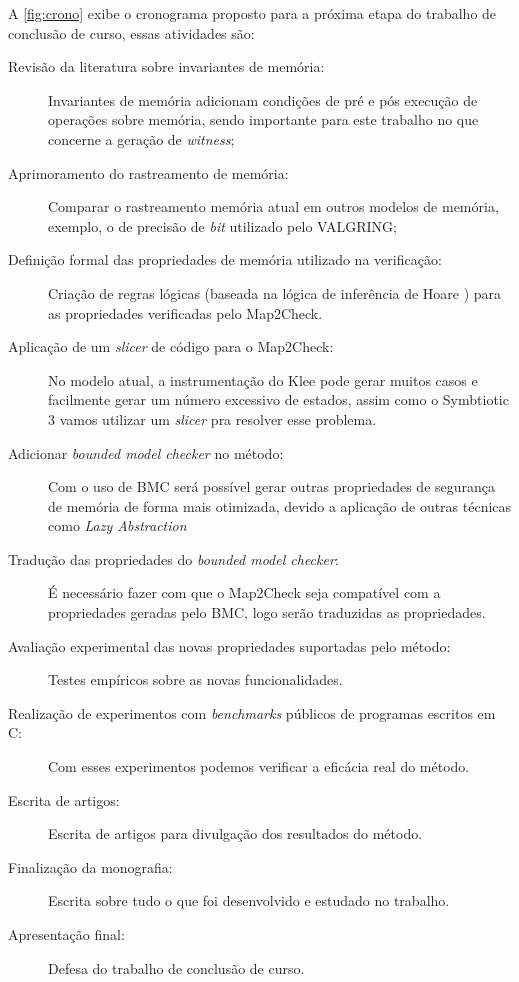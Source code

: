 \label{sec:cronograma}

A \autoref{fig:crono} exibe o cronograma proposto para a próxima etapa do trabalho de conclusão de curso, essas atividades são:

  \begin{description}  
  \item[Revisão da literatura sobre invariantes de memória:] Invariantes de memória adicionam condições de pré e pós execução de operações sobre memória, sendo importante para 
  este trabalho no que concerne a geração de \textit{witness}; 
  \item[Aprimoramento do rastreamento de memória:] Comparar o rastreamento memória atual em outros modelos de memória, exemplo, o de precisão de \textit{bit} utilizado pelo VALGRING;
  \item[Definição formal das propriedades de memória utilizado na verificação:] Criação de regras lógicas (baseada na lógica de inferência de Hoare \cite{Rocha:2015tese}) para as propriedades verificadas pelo Map2Check. 
  \item[Aplicação de um \textit{slicer} de código para o Map2Check:] No modelo atual, a instrumentação do Klee pode gerar muitos casos e facilmente gerar um número excessivo de estados, assim como o Symbtiotic 3 \cite{Chalupa:2016} vamos utilizar um \textit{slicer} pra resolver esse problema.
  \item[Adicionar \textit{bounded model checker} no método:] Com o uso de BMC será possível gerar outras propriedades de segurança de memória de forma mais otimizada, devido a aplicação de outras técnicas como \textit{Lazy Abstraction} \cite{Cordeiro:2012}
  \item[Tradução das propriedades do \textit{bounded model checker}:] É necessário fazer com que o Map2Check seja compatível com a propriedades geradas pelo BMC, logo serão traduzidas as propriedades.
  \item[Avaliação experimental das novas propriedades suportadas pelo método:] Testes empíricos sobre as novas funcionalidades.
  \item[Realização de experimentos com \textit{benchmarks} públicos de programas escritos em C:] Com esses experimentos podemos verificar a eficácia real do método.
  \item[Escrita de artigos:] Escrita de artigos para divulgação dos resultados do método.
  \item[Finalização da monografia:] Escrita sobre tudo o que foi desenvolvido e estudado no trabalho.
  \item[Apresentação final:] Defesa do trabalho de conclusão de curso.
\end{description}


